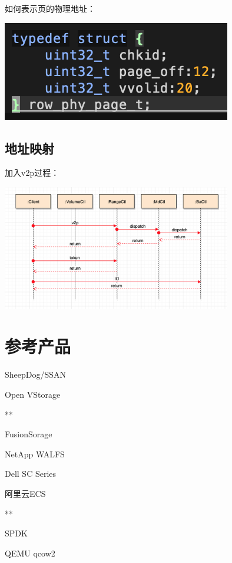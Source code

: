 如何表示页的物理地址：
\begin{center}
\includegraphics[width=10cm]{../imgs/row-phy-page.png}
\end{center}

\subsection{地址映射}

加入v2p过程：
\begin{center}
\includegraphics[width=10cm]{../imgs/data-path.png}
\end{center}

\section{参考产品}

\begin{enumbox}
\item SheepDog/SSAN
\item Open VStorage
\item ***
\item FusionSorage
\item NetApp WALFS
\item Dell SC Series
\item 阿里云ECS
\item ***
\item SPDK
\item QEMU qcow2
\end{enumbox}
